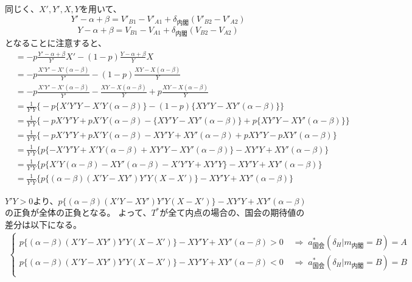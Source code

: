 \documentclass[main.tex]{subfiles}
\begin{document}
同じく、$X', Y', X, Y$を用いて、
$$Y' -\alpha + \beta = V'_{B1}-V'_{A1} + \delta_{内閣}(V'_{B2} - V'_{A2})$$
$$Y  -\alpha + \beta = V_{B1}-V_{A1} + \delta_{内閣}(V_{B2} - V_{A2})$$
となることに注意すると、
\begin{align*}
    &= -p \frac{ Y' -\alpha + \beta }{ Y' } X'  -    (1-p) \frac{ Y  -\alpha + \beta }{ Y }X\\[0.5em]
    &= -p \frac{ X'Y' - X'(\alpha - \beta) }{ Y'}   -    (1-p) \frac{ XY - X(\alpha - \beta) }{ Y }\\[0.5em]
    &= -p \frac{ X'Y' - X'(\alpha - \beta) }{ Y'}   -   \frac{ XY - X(\alpha - \beta) }{ Y } + p\frac{ XY - X(\alpha - \beta) }{ Y }\\[0.5em]
    &= \frac{1}{Y'Y} \Big\{ -p \{ X'Y'Y - X'Y(\alpha - \beta) \}   -    (1-p) \{ XY'Y - XY'(\alpha - \beta)\} \Big\} \\[0.5em]
    &= \frac{1}{Y'Y} \Big\{ -p X'Y'Y +p X'Y(\alpha - \beta)   -    \{XY'Y - XY'(\alpha - \beta)\} + p\{XY'Y - XY'(\alpha - \beta)\} \Big\} \\[0.5em]
    &= \frac{1}{Y'Y} \Big\{ -p X'Y'Y +p X'Y(\alpha - \beta)   -    XY'Y + XY'(\alpha - \beta) + pXY'Y - pXY'(\alpha - \beta) \Big\} \\[0.5em]
    &= \frac{1}{Y'Y} \Big\{ p \{  - X'Y'Y + X'Y(\alpha - \beta)    + XY'Y - XY'(\alpha - \beta) \} -XY'Y + XY'(\alpha - \beta) \Big\} \\[0.5em]
    &= \frac{1}{Y'Y} \Big\{ p \{ X'Y(\alpha - \beta) - XY'(\alpha - \beta) - X'Y'Y + XY'Y  \} -XY'Y + XY'(\alpha - \beta) \Big\} \\[0.5em]
    &= \frac{1}{Y'Y} \Big\{ p \{ (\alpha - \beta)( X'Y- XY')Y'Y(X - X')  \} -XY'Y + XY'(\alpha - \beta) \Big\} 
\end{align*}

$Y'Y>0$より、$p \{ (\alpha - \beta)( X'Y- XY')Y'Y(X - X')  \} -XY'Y + XY'(\alpha - \beta)$の正負が全体の正負となる。
よって、$T^*$が全て内点の場合の、国会の期待値の差分は以下になる。
\begin{align*}
    \begin{cases}
        p \{ (\alpha - \beta)( X'Y- XY')Y'Y(X - X')  \} -XY'Y + XY'(\alpha - \beta) > 0  &\;\Rightarrow\; a^*_{国会}(\delta_H|m_{内閣} = B) = A\\[0.5em]
        p \{ (\alpha - \beta)( X'Y- XY')Y'Y(X - X')  \} -XY'Y + XY'(\alpha - \beta) < 0 &\;\Rightarrow\; a^*_{国会}(\delta_H|m_{内閣} = B) = B\\[0.5em] 
     \end{cases}
\end{align*}
\end{document}
